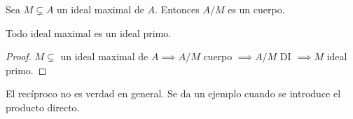 \begin{pro}
	Sea $M \subsetneq A$ un ideal maximal de $A$. Entonces $A/M$ es un cuerpo.
\end{pro}

\begin{pro}
	\label{pro:maximalimplicaprimo}
	Todo ideal maximal es un ideal primo.
\end{pro}

\begin{proof}
	$M \subsetneq$ un ideal maximal de $A \implies A/M$ cuerpo $\implies A/M$ DI $\implies M$ ideal primo.
\end{proof}

El recíproco no es verdad en general. Se da un ejemplo cuando se introduce el producto directo.




